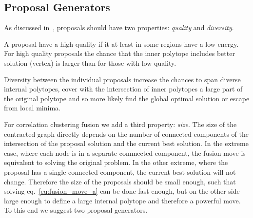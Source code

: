 \documentclass[10pt,twocolumn,letterpaper]{article}
\newtheorem{remark}{Remark}
\theoremstyle{definition}
\newcommand{\OR}{\textrm{ or }}
\begin{document}

\subsection{Proposal Generators}

As discussed in~\cite{Lempitsky-2010}, proposals
should have two properties: \emph{quality} 
and \emph{diversity}.

A proposal have a high quality if it at least in some regions have a low energy.
For high quality proposals the chance that the inner polytope includes 
better solution (vertex) is larger than for those with low quality.

Diversity between the individual proposals increase the chances
to span diverse internal polytopes, cover with the intersection of
inner polytopes a large part of the original polytope and so  
more likely find the global optimal solution or escape from local minima.

For correlation clustering fusion we add a third
property: \emph{size}.
The size of the contracted graph directly
depends on the number of connected components
of the intersection of the proposal solution and the current best solution.
%
In the extreme case, where each 
node is in a separate connnected component,
the fusion move is equivalent to solving the original problem.
In the other extreme, where the proposal has 
a single connected component, the current best solution will not change.
% 
Therefore the size of the proposals
should be small enough, such that solving
eq.~\ref{eq:fusion_move_a} can
be done fast enough, but  on the other side 
large enough to define a large internal polytope and therefore a powerful move.
%
To this end we suggest two proposal generators.
\end{document}
